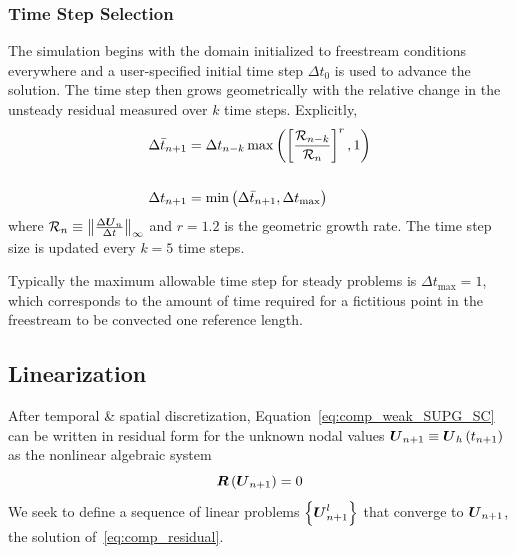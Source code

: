 \documentclass[compress,11pt]{beamer}
\begin{document}
\frame
{
  \frametitle{\scriptsize Time Step Selection}
  \vspace{-1em}
  \footnotesize
  The simulation begins with the domain initialized to freestream conditions everywhere and a user-specified initial time step $\Delta t_0$ is used to advance the solution.  The time step then grows geometrically with the relative change in the unsteady residual measured over $k$ time steps.  Explicitly, 
\begin{align}
  \Delta \bar{t}_{n+1} &= \Delta t_{n-k} \max\left(\left[\frac{\mathcal{R}_{n-k}}{\mathcal{R}_{n}}\right]^r,1\right) \label{geometric_timestep_growth} \\ \vspace{1em}
                 & \nonumber \\
  \Delta t_{n+1} &= \min\left(\Delta \bar{t}_{n+1},\Delta t_{\text{max}}\right) \label{dt_limiting}
\end{align}
where $\mathcal{R}_{n} \equiv \left\|\frac{\Delta {\boldsymbol{U}}_n}{\Delta t}\right\|_{\infty}$ and $r=1.2$ is the geometric growth rate.  The time step size is updated every $k=5$ time steps.
\vspace{1em}

Typically the maximum allowable time step for steady problems is $\Delta t_{\text{max}}=1$, which corresponds to the amount of time required for a fictitious point in the freestream to be convected one reference length.

}


\subsection{Linearization}
\frame
{
  After temporal \& spatial discretization,  Equation~\eqref{eq:comp_weak_SUPG_SC} can be written in residual form for the unknown nodal values ${\boldsymbol{U}}_{n+1}\equiv{\boldsymbol{U}}_h\left(t_{n+1}\right)$ as the nonlinear algebraic system
\begin{equation}
  \label{eq:comp_residual}  
  {\boldsymbol{R}}\left({\boldsymbol{U}}_{n+1}\right) = 0 
\end{equation}
We seek to define a sequence of linear problems $\left\{{\boldsymbol{U}}_{n+1}^l\right\}$ that converge to ${\boldsymbol{U}}_{n+1}$, the solution of~\eqref{eq:comp_residual}.
}
\end{document}
